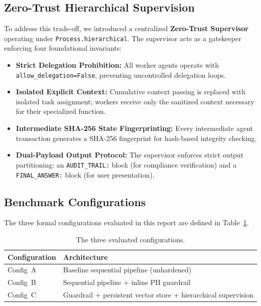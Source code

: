 \documentclass[11pt,a4paper]{article}
\begin{document}
\subsection{Zero-Trust Hierarchical Supervision}
To address this trade-off, we introduced a centralized \textbf{Zero-Trust Supervisor} operating under \texttt{Process.hierarchical}. The supervisor acts as a gatekeeper enforcing four foundational invariants:
\begin{itemize}
    \item \textbf{Strict Delegation Prohibition:} All worker agents operate with \texttt{allow\_delegation=False}, preventing uncontrolled delegation loops.
    \item \textbf{Isolated Explicit Context:} Cumulative context passing is replaced with isolated task assignment; workers receive only the sanitized context necessary for their specialized function.
    \item \textbf{Intermediate SHA-256 State Fingerprinting:} Every intermediate agent transaction generates a SHA-256 fingerprint for hash-based integrity checking.
    \item \textbf{Dual-Payload Output Protocol:} The supervisor enforces strict output partitioning: an \texttt{AUDIT\_TRAIL:} block (for compliance verification) and a \texttt{FINAL\_ANSWER:} block (for user presentation).
\end{itemize}

\subsection{Benchmark Configurations}
The three formal configurations evaluated in this report are defined in Table~\ref{tab:configs}.

\begin{table}[htbp]
\centering
\small
\begin{tabularx}{\textwidth}{l X}
\toprule
\textbf{Configuration} & \textbf{Architecture} \\
\midrule
Config~A & Baseline sequential pipeline (unhardened) \\
Config~B & Sequential pipeline $+$ inline PII guardrail \\
Config~C & Guardrail $+$ persistent vector store $+$ hierarchical supervision \\
\bottomrule
\end{tabularx}
\caption{The three evaluated configurations.}
\label{tab:configs}
\end{table}
\end{document}
